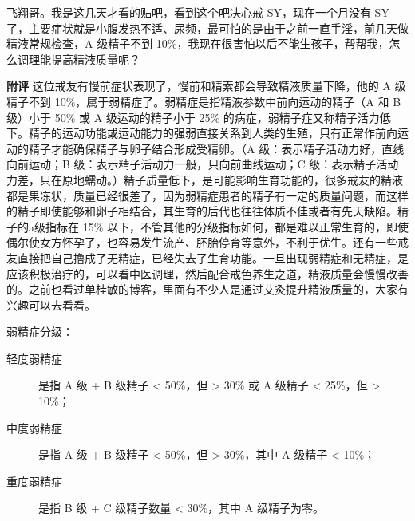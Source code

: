 \begin{case}
    飞翔哥。我是这几天才看的贴吧，看到这个吧决心戒 SY，现在一个月没有 SY 了，主要症状就是小腹发热不适、尿频，最可怕的是由于之前一直手淫，前几天做精液常规检查，A 级精子不到 10\%，我现在很害怕以后不能生孩子，帮帮我，怎么调理能提高精液质量呢？

    \textbf{附评} 这位戒友有慢前症状表现了，慢前和精索都会导致精液质量下降，他的 A 级精子不到 10\%，属于弱精症了。弱精症是指精液参数中前向运动的精子（A 和 B 级）小于 50\% 或 A 级运动的精子小于 25\% 的病症，弱精子症又称精子活力低下。精子的运动功能或运动能力的强弱直接关系到人类的生殖，只有正常作前向运动的精子才能确保精子与卵子结合形成受精卵。（A 级：表示精子活动力好，直线向前运动；B 级：表示精子活动力一般，只向前曲线运动；C 级：表示精子活动力差，只在原地蠕动。）精子质量低下，是可能影响生育功能的，很多戒友的精液都是果冻状，质量已经很差了，因为弱精症患者的精子有一定的质量问题，而这样的精子即使能够和卵子相结合，其生育的后代也往往体质不佳或者有先天缺陷。精子的a级指标在 15\% 以下，不管其他的分级指标如何，都是难以正常生育的，即使偶尔使女方怀孕了，也容易发生流产、胚胎停育等意外，不利于优生。还有一些戒友直接把自己撸成了无精症，已经失去了生育功能。一旦出现弱精症和无精症，是应该积极治疗的，可以看中医调理，然后配合戒色养生之道，精液质量会慢慢改善的。之前也看过单桂敏的博客，里面有不少人是通过艾灸提升精液质量的，大家有兴趣可以去看看。

    弱精症分级：

    \begin{description}
        \item[轻度弱精症] 是指 A 级 + B 级精子 < 50\%，但 > 30\% 或 A 级精子 < 25\%，但 > 10\%；
        \item[中度弱精症] 是指 A 级 + B 级精子 < 50\%，但 > 30\%，其中 A 级精子 < 10\%；
        \item[重度弱精症] 是指 B 级 + C 级精子数量 < 30\%，其中 A 级精子为零。
    \end{description}
\end{case}

